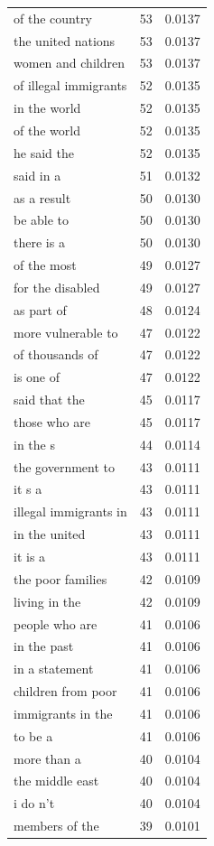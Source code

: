 \begin{tabular}{lrl}
of the country & 53 & 0.0137 \\
the united nations & 53 & 0.0137 \\
women and children & 53 & 0.0137 \\
of illegal immigrants & 52 & 0.0135 \\
in the world & 52 & 0.0135 \\
of the world & 52 & 0.0135 \\
he said the & 52 & 0.0135 \\
said in a & 51 & 0.0132 \\
as a result & 50 & 0.0130 \\
be able to & 50 & 0.0130 \\
there is a & 50 & 0.0130 \\
of the most & 49 & 0.0127 \\
for the disabled & 49 & 0.0127 \\
as part of & 48 & 0.0124 \\
more vulnerable to & 47 & 0.0122 \\
of thousands of & 47 & 0.0122 \\
is one of & 47 & 0.0122 \\
said that the & 45 & 0.0117 \\
those who are & 45 & 0.0117 \\
in the s & 44 & 0.0114 \\
the government to & 43 & 0.0111 \\
it s a & 43 & 0.0111 \\
illegal immigrants in & 43 & 0.0111 \\
in the united & 43 & 0.0111 \\
it is a & 43 & 0.0111 \\
the poor families & 42 & 0.0109 \\
living in the & 42 & 0.0109 \\
people who are & 41 & 0.0106 \\
in the past & 41 & 0.0106 \\
in a statement & 41 & 0.0106 \\
children from poor & 41 & 0.0106 \\
immigrants in the & 41 & 0.0106 \\
to be a & 41 & 0.0106 \\
more than a & 40 & 0.0104 \\
the middle east & 40 & 0.0104 \\
i do n't & 40 & 0.0104 \\
members of the & 39 & 0.0101 \\

\end{tabular}
